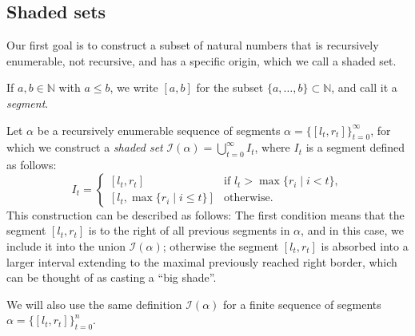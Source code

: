 \documentclass[12pt,a4paper]{amsart}
\begin{document}

\subsection{Shaded sets}
Our first goal is to construct a subset of natural numbers that is recursively enumerable, not recursive, and has a specific origin, which we call a shaded set.

\smallskip

If $a,b\in \mathbb N$ with $a\leq b$, we write $[a,b]$ for the subset $\{ a, \ldots, b \}\subset \mathbb N$, and call it a \emph{segment}.

\smallskip

Let $\alpha$ be a recursively enumerable sequence of segments $\alpha=\{[l_t,r_t]\}_{t=0}^\infty$, for which we construct a \emph{shaded set} $\mathcal I(\alpha)=\bigcup_{t=0}^{\infty} I_t$, where $I_t$ is a segment defined as follows:
\begin{equation}
\label{it-case}
I_t =
 \begin{cases}
   [l_t,r_t] &\text{if $l_t>\max \{r_i \mid i<t\}$},\\
   [l_t,\max \{r_i \mid i\leq t\}] &\text{otherwise}.
 \end{cases}
\end{equation}
This construction can be described as follows: The first condition means that the segment $[l_t,r_t]$ is to the right of all previous segments in $\alpha$, and in this case, we include it into the union $\mathcal I(\alpha)$; otherwise the segment $[l_t, r_t]$ is absorbed into a larger interval extending to the maximal previously reached right border, which can be thought of as casting a ``big shade''.

\smallskip

We will also use the same definition $\mathcal I(\alpha)$ for a finite sequence of segments $\alpha=\{[l_t,r_t]\}_{t=0}^n$.
\end{document}
